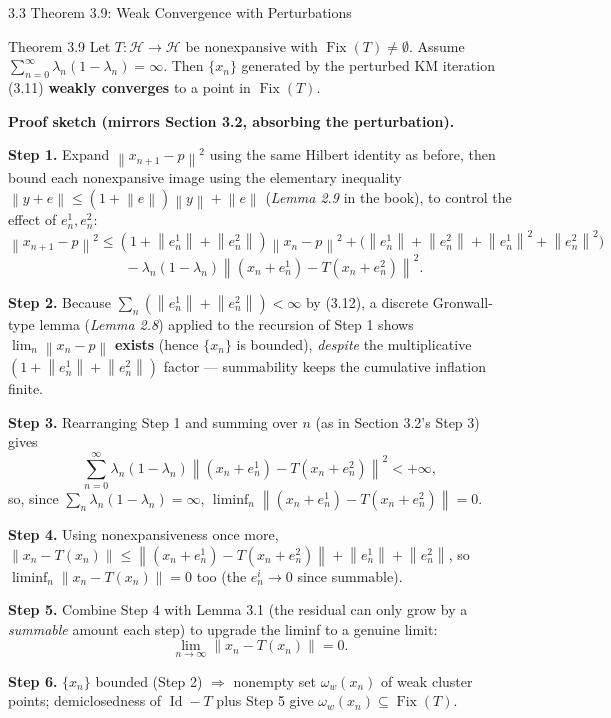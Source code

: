 \documentclass[aspectratio=169,10pt]{beamer}
\newcommand{\cH}{\mathcal{H}}
\newcommand{\Fix}{\operatorname{Fix}}
\newcommand{\norm}[1]{\left\|#1\right\|}
\begin{document}
\begin{frame}[allowframebreaks]{3.3 Theorem 3.9: Weak Convergence with Perturbations}

  \begin{block}{Theorem 3.9}
    Let $T:\cH\to\cH$ be nonexpansive with $\Fix(T)\ne\emptyset$.
    Assume $\sum_{n=0}^{\infty}\lambda_n(1-\lambda_n)=\infty$. Then
    $\{x_n\}$ generated by the perturbed KM iteration (3.11)
    \textbf{weakly converges} to a point in $\Fix(T)$.
  \end{block}

  \textbf{Proof sketch (mirrors Section 3.2, absorbing the perturbation).}

  \textbf{Step 1.} Expand $\norm{x_{n+1}-p}^2$ using the same Hilbert
  identity as before, then bound each nonexpansive image using the
  elementary inequality
  $\norm{y+e}\le(1+\norm e)\norm y + \norm e$ (\emph{Lemma 2.9} in the
  book), to control the effect of $e_n^1,e_n^2$:
  $$\norm{x_{n+1}-p}^2\le(1+\norm{e_n^1}+\norm{e_n^2})\norm{x_n-p}^2
  +\bigl(\norm{e_n^1}+\norm{e_n^2}+\norm{e_n^1}^2+\norm{e_n^2}^2\bigr)$$
  $$\qquad -\lambda_n(1-\lambda_n)\norm{(x_n+e_n^1)-T(x_n+e_n^2)}^2.$$

  \framebreak

  \textbf{Step 2.} Because $\sum_n(\norm{e_n^1}+\norm{e_n^2})<\infty$ by
  (3.12), a discrete Gronwall-type lemma (\emph{Lemma 2.8}) applied to
  the recursion of Step 1 shows $\lim_n\norm{x_n-p}$ \textbf{exists}
  (hence $\{x_n\}$ is bounded), \emph{despite} the multiplicative
  $(1+\norm{e_n^1}+\norm{e_n^2})$ factor --- summability keeps the
  cumulative inflation finite.

  \textbf{Step 3.} Rearranging Step 1 and summing over $n$ (as in
  Section 3.2's Step 3) gives
  $$\sum_{n=0}^\infty \lambda_n(1-\lambda_n)\norm{(x_n+e_n^1)-T(x_n+e_n^2)}^2<+\infty,$$
  so, since $\sum_n\lambda_n(1-\lambda_n)=\infty$,
  $\liminf_n\norm{(x_n+e_n^1)-T(x_n+e_n^2)}=0$.

  \textbf{Step 4.} Using nonexpansiveness once more,
  $\norm{x_n-T(x_n)}\le\norm{(x_n+e_n^1)-T(x_n+e_n^2)}+\norm{e_n^1}+\norm{e_n^2}$,
  so $\liminf_n\norm{x_n-T(x_n)}=0$ too (the $e_n^i\to0$ since summable).

  \framebreak

  \textbf{Step 5.} Combine Step 4 with Lemma 3.1 (the residual can only
  grow by a \emph{summable} amount each step) to upgrade the liminf to
  a genuine limit:
  $$\lim_{n\to\infty}\norm{x_n-T(x_n)}=0.$$

  \textbf{Step 6.} $\{x_n\}$ bounded (Step 2) $\Rightarrow$ nonempty set
  $\omega_w(x_n)$ of weak cluster points; demiclosedness of
  $\operatorname{Id}-T$ plus Step 5 give $\omega_w(x_n)\subseteq\Fix(T)$.


\end{frame}
\end{document}
